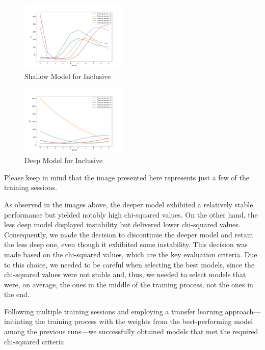 \documentclass[EPJ,twocolumn]{webofc}
\begin{document}
\begin{figure}[H]
\centering
    \includegraphics[width=0.45\textwidth]{graphs/nn_incl_metrics.png}
    \caption{Shallow Model for Inclusive}
    \label{fig:accuracy_loss_incl}
\end{figure}
\hfill
\begin{figure}[H]
\centering
    \includegraphics[width=0.45\textwidth]{graphs/nn_incl_metrics_deeper.png}
    \caption{Deep Model for Inclusive}
    \label{fig:accuracy_loss_incl_deep}
\end{figure}




Please keep in mind that the image presented here represents just a few of the training sessions.

As observed in the images above, the deeper model exhibited a relatively stable performance but yielded notably high
chi-squared values. On the other hand, the less deep model displayed instability but delivered lower chi-squared values.
Consequently, we made the decision to discontinue the deeper model and retain the less deep one, even though it exhibited
some instability. This decision was made based on the chi-squared values, which are the key evaluation criteria.
Due to this choice, we needed to be careful when selecting the best models, since the chi-squared values were not stable
and, thus, we needed to select models that were, on average, the ones in the middle of the training process, not the ones
in the end. 

Following multiple training sessions and employing a transfer learning approach—initiating the training process with the weights from the best-performing model among the previous runs—we successfully obtained models that met the required chi-squared criteria.
\end{document}
